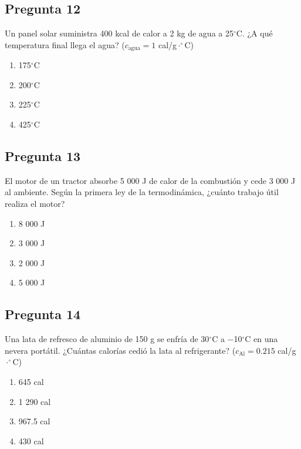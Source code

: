 \begin{preguntabox}
\subsection{Pregunta 12}
Un panel solar suministra 400 kcal de calor a 2 kg de agua a 25$^\circ$C. ¿A qué temperatura final llega el agua? ($c_{\text{agua}} = 1$ cal/g$\cdot^\circ$C)

\begin{enumerate}
    \item[A)] 175$^\circ$C
    \item[B)] 200$^\circ$C
    \item[C)] 225$^\circ$C
    \item[D)] 425$^\circ$C
\end{enumerate}
\end{preguntabox}

\begin{preguntabox}
\subsection{Pregunta 13}
El motor de un tractor absorbe 5 000 J de calor de la combustión y cede 3 000 J al ambiente. Según la primera ley de la termodinámica, ¿cuánto trabajo útil realiza el motor?

\begin{enumerate}
    \item[A)] 8 000 J
    \item[B)] 3 000 J
    \item[C)] 2 000 J
    \item[D)] 5 000 J
\end{enumerate}
\end{preguntabox}

\begin{preguntabox}
\subsection{Pregunta 14}
Una lata de refresco de aluminio de 150 g se enfría de 30$^\circ$C a $-$10$^\circ$C en una nevera portátil. ¿Cuántas calorías cedió la lata al refrigerante? ($c_{\text{Al}} = 0.215$ cal/g$\cdot^\circ$C)

\begin{enumerate}
    \item[A)] 645 cal
    \item[B)] 1 290 cal
    \item[C)] 967.5 cal
    \item[D)] 430 cal
\end{enumerate}
\end{preguntabox}

